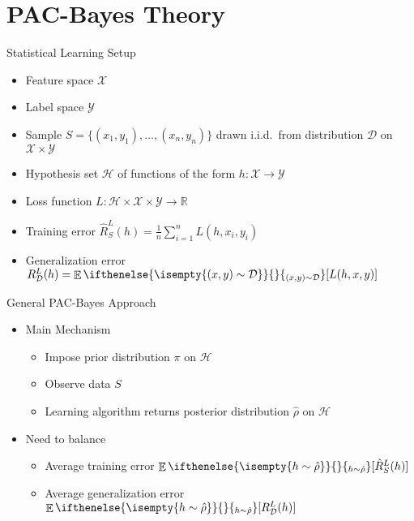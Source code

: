 \documentclass[aspectratio=169]{beamer}
\DeclareMathOperator*{\EvOp}{\mathbb{E}}
\newcommand{\CD}{\mathcal{D}}
\newcommand{\CH}{\mathcal{H}}
\newcommand{\CX}{\mathcal{X}}
\newcommand{\CY}{\mathcal{Y}}
\newcommand{\RR}{\mathbb{R}}
\newcommand*{\Ev}[2][]{%
  \mathchoice{%
    \EvOp\ifthenelse{\isempty{#1}}{}{_{#1}}\left[#2\right]%
  }{%
    \EvOp\ifthenelse{\isempty{#1}}{}{_{#1}}[#2]%
  }{%
    \EvOp\ifthenelse{\isempty{#1}}{}{_{#1}}[#2]%
  }{%
    \EvOp\ifthenelse{\isempty{#1}}{}{_{#1}}[#2]%
  }%
}
\begin{document}
\section{PAC-Bayes Theory}

\begin{frame}{Statistical Learning Setup}
  \begin{itemize}
    \item
      Feature space $\CX$
    \item
      Label space $\CY$
    \item
      Sample $S = \{(x_1, y_1), \ldots, (x_n, y_n)\}$ drawn i.i.d.\ from
      distribution $\CD$ on $\CX \times \CY$
    \item
      Hypothesis set $\CH$ of functions of the form $h : \CX \to \CY$
    \item
      Loss function $L : \CH \times \CX \times \CY \to \RR$
    \item
      Training error $\hat{R}_S^L(h) = \frac{1}{n} \sum_{i = 1}^n L(h, x_i,
      y_i)$
    \item
      Generalization error $R_\CD^L(h) = \Ev[(x, y) \sim \CD]{L(h, x, y)}$
  \end{itemize}
\end{frame}

\begin{frame}{General PAC-Bayes Approach}
  \begin{itemize}
    \item
      Main Mechanism
      \begin{itemize}
        \item
          Impose prior distribution $\pi$ on $\CH$
        \item
          Observe data $S$
        \item
          Learning algorithm returns posterior distribution $\hat{\rho}$ on $\CH$
      \end{itemize}
    \item
      Need to balance
      \begin{itemize}
        \item
          Average training error $\Ev[h \sim \hat{\rho}]{\hat{R}_S^L(h)}$
        \item
          Average generalization error $\Ev[h \sim \hat{\rho}]{R_\CD^L(h)}$
      \end{itemize}
  \end{itemize}
\end{frame}
\end{document}
